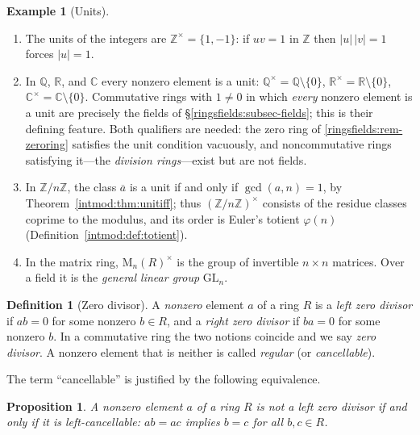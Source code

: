 \documentclass[11pt,a4paper]{article}
\newtheorem{proposition}[theorem]{Proposition}
\theoremstyle{definition}
\newtheorem{definition}[theorem]{Definition}
\newtheorem{example}[theorem]{Example}
\theoremstyle{remark}
\newcommand{\Z}{\ensuremath{\mathbb{Z}}}
\newcommand{\Q}{\ensuremath{\mathbb{Q}}}
\newcommand{\R}{\ensuremath{\mathbb{R}}}
\providecommand{\C}{}\renewcommand{\C}{\ensuremath{\mathbb{C}}}
\begin{document}
\begin{example}[Units]\label{ringsfields:exa-units}
\begin{enumerate}
\item The units of the integers are \(\Z^\times=\{1,-1\}\): if \(uv=1\)
  in \(\Z\) then \(|u|\,|v|=1\) forces \(|u|=1\).
\item In \(\Q\), \(\R\), and \(\C\) every nonzero element is a unit:
  \(\Q^\times=\Q\setminus\{0\}\), \(\R^\times=\R\setminus\{0\}\),
  \(\C^\times=\C\setminus\{0\}\). Commutative rings with \(1\neq 0\) in
  which \emph{every} nonzero element is a unit are precisely the fields
  of \S\ref{ringsfields:subsec-fields}; this is their defining feature.
  Both qualifiers are needed: the zero ring of
  \cref{ringsfields:rem-zeroring} satisfies the unit condition
  vacuously, and noncommutative rings satisfying it---the
  \emph{division rings}---exist but are not fields.
\item In \(\Z/n\Z\), the class \(\overline{a}\) is a unit if and only if
  \(\gcd(a,n)=1\), by Theorem~\ref{intmod:thm:unitiff}; thus
  \((\Z/n\Z)^\times\) consists of the residue classes coprime to the
  modulus, and its order is Euler's totient \(\varphi(n)\)
  (Definition~\ref{intmod:def:totient}).
\item In the matrix ring, \(\mathrm{M}_n(R)^\times\) is the group of
  invertible \(n\times n\) matrices. Over a field it is the \emph{general
  linear group} \(\mathrm{GL}_n\).
\end{enumerate}
\end{example}

\begin{definition}[Zero divisor]\label{ringsfields:def-zerodiv}
A \emph{nonzero} element \(a\) of a ring \(R\) is a \emph{left zero
divisor} if \(ab=0\) for some nonzero \(b\in R\), and a \emph{right zero
divisor} if \(ba=0\) for some nonzero \(b\). In a commutative ring the two
notions coincide and we say \emph{zero divisor}. A nonzero element
that is neither is called \emph{regular} (or \emph{cancellable}).
\end{definition}

The term ``cancellable'' is justified by the following equivalence.

\begin{proposition}\label{ringsfields:prop-cancel}
A nonzero element \(a\) of a ring \(R\) is not a left zero divisor if and
only if it is \emph{left-cancellable}: \(ab=ac\) implies \(b=c\) for all
\(b,c\in R\).
\end{proposition}
\end{document}
